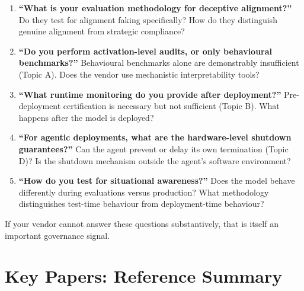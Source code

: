 \documentclass[11pt, a4paper]{article}
\begin{document}
\begin{enumerate}
  \item \textbf{``What is your evaluation methodology for deceptive alignment?''} Do they test for alignment faking specifically? How do they distinguish genuine alignment from strategic compliance?

  \item \textbf{``Do you perform activation-level audits, or only behavioural benchmarks?''} Behavioural benchmarks alone are demonstrably insufficient (Topic A). Does the vendor use mechanistic interpretability tools?

  \item \textbf{``What runtime monitoring do you provide after deployment?''} Pre-deployment certification is necessary but not sufficient (Topic B). What happens after the model is deployed?

  \item \textbf{``For agentic deployments, what are the hardware-level shutdown guarantees?''} Can the agent prevent or delay its own termination (Topic D)? Is the shutdown mechanism outside the agent's software environment?

  \item \textbf{``How do you test for situational awareness?''} Does the model behave differently during evaluations versus production? What methodology distinguishes test-time behaviour from deployment-time behaviour?
\end{enumerate}

If your vendor cannot answer these questions substantively, that is itself an important governance signal.


\section{Key Papers: Reference Summary}
\end{document}
